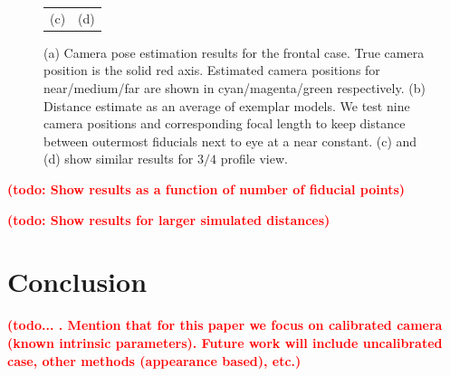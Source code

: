 \documentclass[runningheads]{llncs}
\newcommand {\afbnote} [1] {{\bf \textcolor{red}{(#1)}}}
\begin{document}
\begin{figure}[ht]
\begin{tabular}{cc}
(c) & (d)
\end{tabular}
\caption{	
(a) Camera pose estimation results for the frontal case.  
True camera position is the solid red axis.  
Estimated camera positions for near/medium/far are shown in cyan/magenta/green respectively.   
(b) Distance estimate as an average of exemplar models.  
We test nine camera positions and corresponding focal length to keep distance between outermost fiducials next to eye at a near constant. 
(c) and (d) show similar results for $3/4$ profile view.}
\label{fig:results}
\end{figure}

\afbnote{todo: Show results as a function of number of fiducial points}

\afbnote{todo: Show results for larger simulated distances}

\section{Conclusion}
\afbnote{todo... .  Mention that for this paper we focus on calibrated camera (known intrinsic parameters).  Future work will include uncalibrated case, other methods (appearance based), etc.}



\end{document}
